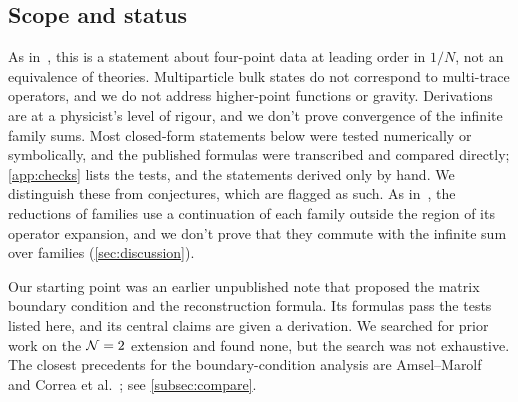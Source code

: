 \subsection*{Scope and status}

As in~\cite{Thong:2026}, this is a statement about four-point data at leading order in $1/N$, not an equivalence of theories. Multiparticle bulk states do not correspond to multi-trace operators, and we do not address higher-point functions or gravity. Derivations are at a physicist's level of rigour, and we don't prove convergence of the infinite family sums. Most closed-form statements below were tested numerically or symbolically, and the published formulas were transcribed and compared directly; \cref{app:checks} lists the tests, and the statements derived only by hand. We distinguish these from conjectures, which are flagged as such. As in~\cite{Thong:2026}, the reductions of families use a continuation of each family outside the region of its operator expansion, and we don't prove that they commute with the infinite sum over families (\cref{sec:discussion}).

Our starting point was an earlier unpublished note that proposed the matrix boundary condition and the reconstruction formula. Its formulas pass the tests listed here, and its central claims are given a derivation. We searched for prior work on the $\mathcal{N}=2$ extension and found none, but the search was not exhaustive. The closest precedents for the boundary-condition analysis are Amsel--Marolf~\cite{Amsel:2008iz} and Correa et al.~\cite{Correa:2019rdk}; see \cref{subsec:compare}.
